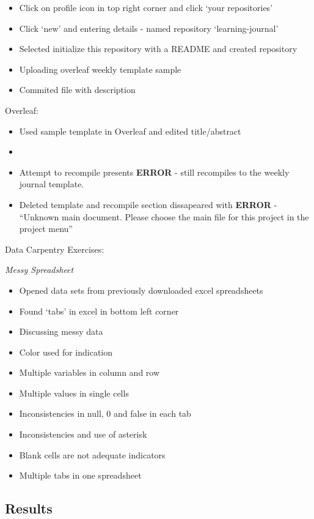 \documentclass{article}
\begin{document}
\begin{itemize}
    \item Click on profile icon in top right corner and click ‘your repositories’
    \item Click ‘new’ and entering details - named repository ‘learning-journal’
    \item Selected initialize this repository with a README and created repository
    \item Uploading overleaf weekly template sample
    \item Commited file with description
\end{itemize}
 
Overleaf:
\begin{itemize}
    \item Used sample template in Overleaf and edited title/abstract 
    \item 
    \item Attempt to recompile presents \textbf{ERROR} - still recompiles to the weekly journal template. 
    \item Deleted template and recompile section dissapeared with \textbf{ERROR} - “Unknown main document. Please choose the main file for this project in the project menu”
\end{itemize}

Data Carpentry Exercises:

\textit{Messy Spreadsheet}

\begin{itemize}
    \item Opened data sets from previously downloaded excel spreadsheets
    \item Found ‘tabs’ in excel in bottom left corner
    \item Discussing messy data
    \item Color used for indication
    \item Multiple variables in column and row
    \item Multiple values in single cells
    \item Inconsistencies in null, 0 and false in each tab
    \item Inconsistencies and use of asterisk
    \item Blank cells are not adequate indicators
    \item Multiple tabs in one spreadsheet
\end{itemize}

\subsection{Results}
\end{document}
